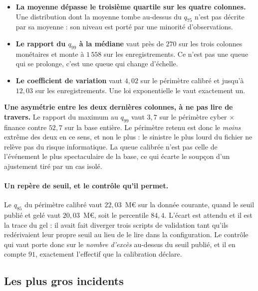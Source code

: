 \begin{itemize}[leftmargin=1.4em,itemsep=3pt]
\item \textbf{La moyenne dépasse le troisième quartile sur les quatre colonnes.} Une
      distribution dont la moyenne tombe au-dessus du $q_{75}$ n'est pas décrite par sa moyenne :
      son niveau est porté par une minorité d'observations.
\item \textbf{Le rapport du $q_{99}$ à la médiane} vaut près de $270$ sur les trois colonnes
      monétaires et monte à $1\,558$ sur les enregistrements. Ce n'est pas une queue qui se
      prolonge, c'est une queue qui change d'échelle.
\item \textbf{Le coefficient de variation} vaut $4{,}02$ sur le périmètre calibré et jusqu'à
      $12{,}03$ sur les enregistrements. Une loi exponentielle le vaut exactement un.
\end{itemize}


\begin{attention}
\textbf{Une asymétrie entre les deux dernières colonnes, à ne pas lire de travers.} Le rapport
du maximum au $q_{99}$ vaut $3{,}7$ sur le périmètre cyber $\times$ finance contre $52{,}7$ sur
la base entière. Le périmètre retenu est donc le \emph{moins} extrême des deux en ce sens, et non
le plus : le sinistre le plus lourd du fichier ne relève pas du risque informatique. La queue
calibrée n'est pas celle de l'événement le plus spectaculaire de la base, ce qui écarte le
soupçon d'un ajustement tiré par un cas isolé.
\end{attention}

\paragraph{Un repère de seuil, et le contrôle qu'il permet.} Le $q_{85}$ du périmètre calibré
vaut $22{,}03$~M\euro{} sur la donnée courante, quand le seuil publié et gelé vaut
$20{,}03$~M\euro, soit le percentile $84{,}4$. L'écart est attendu et il est la trace du gel : il
avait fait diverger trois scripts de validation tant qu'ils redérivaient leur propre seuil au
lieu de le lire dans la configuration. Le contrôle qui vaut porte donc sur le \emph{nombre
d'excès} au-dessus du seuil publié, et il en compte $91$, exactement l'effectif que la
calibration déclare.

\subsection{Les plus gros incidents}
\label{subsec:top-incidents}


